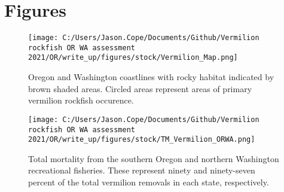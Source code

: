 \documentclass[11pt,
  english,
  a4paper,
]{article}
\begin{document}




\newpage







\newpage



\newpage

\clearpage


\hypertarget{figures}{%
\section{Figures}\label{figures}}

\leavevmode\tagmcend\tagstructend


\begin{figure}
\centering
\texttt{[image: C:/Users/Jason.Cope/Documents/Github/Vermilion rockfish OR WA assessment 2021/OR/write\_up/figures/stock/Vermilion\_Map.png]}
\caption{Oregon and Washington coastlines with rocky habitat indicated by brown shaded areas. Circled areas represent areas of primary vermilion rockfish occurence.\label{fig:ORWA-map}}
\end{figure}

\tagmcend\tagstructend


\begin{figure}
\centering
\texttt{[image: C:/Users/Jason.Cope/Documents/Github/Vermilion rockfish OR WA assessment 2021/OR/write\_up/figures/stock/TM\_Vermilion\_ORWA.png]}
\caption{Total mortality from the southern Oregon and northern Washington recreational fisheries. These represent ninety and ninety-seven percent of the total vermilion removals in each state, respectively.\label{fig:tm-plot}}
\end{figure}
\end{document}
